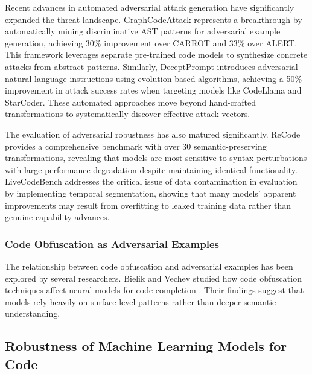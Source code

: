 \documentclass[%
thesis=student,%
coverpage=false,%
titlepage=false,%
headmarks=true, %
english,%
font=libertine, %
math=newpxtx, %
BCOR=5mm,%
coverBCOR=11mm%
]{tum-templates/book/tumbook}
\begin{document}
Recent advances in automated adversarial attack generation have significantly expanded the threat landscape. GraphCodeAttack \cite{Nguyen2024} represents a breakthrough by automatically mining discriminative AST patterns for adversarial example generation, achieving 30\% improvement over CARROT and 33\% over ALERT. This framework leverages separate pre-trained code models to synthesize concrete attacks from abstract patterns. Similarly, DeceptPrompt \cite{Wu2023} introduces adversarial natural language instructions using evolution-based algorithms, achieving a 50\% improvement in attack success rates when targeting models like CodeLlama and StarCoder. These automated approaches move beyond hand-crafted transformations to systematically discover effective attack vectors.

The evaluation of adversarial robustness has also matured significantly. ReCode \cite{Wang2022} provides a comprehensive benchmark with over 30 semantic-preserving transformations, revealing that models are most sensitive to syntax perturbations with large performance degradation despite maintaining identical functionality. LiveCodeBench \cite{Jain2024} addresses the critical issue of data contamination in evaluation by implementing temporal segmentation, showing that many models' apparent improvements may result from overfitting to leaked training data rather than genuine capability advances.


\subsubsection{Code Obfuscation as Adversarial Examples}
The relationship between code obfuscation and adversarial examples has been explored by several researchers. Bielik and Vechev studied how code obfuscation techniques affect neural models for code completion \cite{Bielik2020}. Their findings suggest that models rely heavily on surface-level patterns rather than deeper semantic understanding.


\subsection{Robustness of Machine Learning Models for Code}
\end{document}
